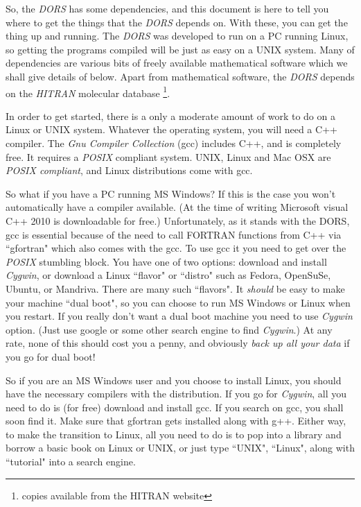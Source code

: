 \documentclass[12pt]{article}
\begin{document}
 So, the {\it DORS} has some dependencies, and this document is here to tell you
where to get the things that the {\it DORS} depends on. With these, you can get the thing up and running.
The {\it DORS} was developed to run on a PC running Linux, so getting the programs compiled
will be just as easy on a UNIX system. Many of  dependencies are  various bits of freely
available mathematical software which we shall give details of below. Apart from mathematical
software, the {\it DORS}
 depends on the {\it HITRAN}
molecular database \cite{RothmanETAL:Mybib} \cite{RothmanETAL96:Mybib} \cite{RothmanETAL08:Mybib} \footnote{copies available from the HITRAN website}.

 In order to get started, there is a only a moderate
amount of work to do on a Linux or UNIX system. Whatever the operating system, you will need a C++ compiler.
The {\it Gnu Compiler Collection} (gcc) includes C++, and is  completely free. It requires a {\it POSIX} compliant system. UNIX, 
Linux and Mac OSX are { \it POSIX compliant}, and Linux distributions come with gcc. 

 So what if you have
a PC running MS Windows? 
If this is the
case you won't automatically have a compiler available. (At the time of writing Microsoft visual C++ 2010 is
 downloadable for free.) Unfortunately, as it stands with the DORS, gcc is essential because of the need to
call FORTRAN functions from C++ via ``gfortran" which also comes with the gcc. To use gcc it you need 
to get over the {\it POSIX} stumbling block. 
You have one of two options: download and install {\it Cygwin}, or download a Linux ``flavor" or ``distro" 
 such as Fedora, OpenSuSe, Ubuntu, or Mandriva. There are many such ``flavors". It {\it should} be easy to make
your machine ``dual boot", so you can choose to run MS Windows or Linux when you restart.
If you  really don't want a dual boot machine you need to use {\it Cygwin} option. (Just use google or some other search engine
to find {\it Cygwin}.) At any rate, none of this should cost you a penny, and obviously {\it back up all
your data } if you go for dual boot! 


So if you are an MS Windows user  and you choose to install Linux, you should have the necessary compilers
with the distribution. If you
go for {\it Cygwin}, all
you need to do is (for free) download and install gcc.
If you search on gcc, you shall soon find it. Make sure that gfortran gets installed
along with g++. 
Either way, to make the transition to Linux, all you need to do is to pop into a library and borrow a basic book on Linux
 or UNIX, or just type ``UNIX", ``Linux", along with  ``tutorial" into a search engine.
\end{document}
